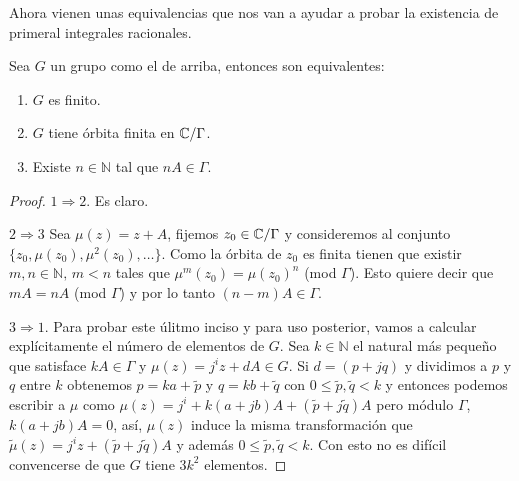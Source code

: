 Ahora vienen unas equivalencias que nos van a ayudar a probar la existencia de primeral integrales racionales.

\begin{Corolario}
\label{Coro:Equivalencias}
Sea $G$ un grupo como el de arriba, entonces son equivalentes:
\begin{enumerate}
\item $G$ es finito.
\item $G$ tiene órbita finita en $\mathbb{C}/\Gamma$.
\item Existe $n\in\mathbb{N}$ tal que $nA\in\Gamma$.
\end{enumerate}
\end{Corolario}
\begin{proof}
$1\Rightarrow 2$. Es claro.

\noindent $2\Rightarrow 3$ Sea $\mu(z)=z+A$, fijemos $z_{0}\in\mathbb{C}/\Gamma$ y consideremos al conjunto $\{z_{0},\mu(z_{0}),\mu^{2}(z_{0}),\ldots \}$. Como la órbita de $z_{0}$ es finita tienen que existir $m,n\in\mathbb{N},\, m<n$ tales que $\mu^{m}(z_{0})=\mu(z_{0})^{n}$ (mod $\Gamma$). Esto quiere decir que $mA=nA$ (mod $\Gamma$) y por lo tanto $(n-m)A\in\Gamma$.

\noindent $3\Rightarrow 1$. Para probar este úlitmo inciso y para uso posterior, vamos a calcular explícitamente el número de elementos de $G$. Sea $k\in\mathbb{N}$ el natural más pequeño que satisface $kA\in\Gamma$ y $\mu(z)=j^{i}z+dA\in G$. Si $d=(p+jq)$ y dividimos a $p$ y $q$ entre $k$ obtenemos $p=ka +\tilde{p}$ y $q=kb+\tilde{q}$ con $0\leq\tilde{p},\tilde{q}<k$ y entonces podemos escribir a $\mu$ como $\mu(z)=j^{i}+k(a+jb)A+(\tilde{p}+j\tilde{q})A$ pero módulo $\Gamma$, $k(a+jb)A=0$, así, $\mu(z)$ induce la misma transformación que $\tilde{\mu}(z)=j^{i}z+(\tilde{p}+j\tilde{q})A$ y además $0\leq\tilde{p},\tilde{q}<k$. Con esto no es difícil convencerse de que $G$ tiene $3k^{2}$ elementos.
\end{proof}
